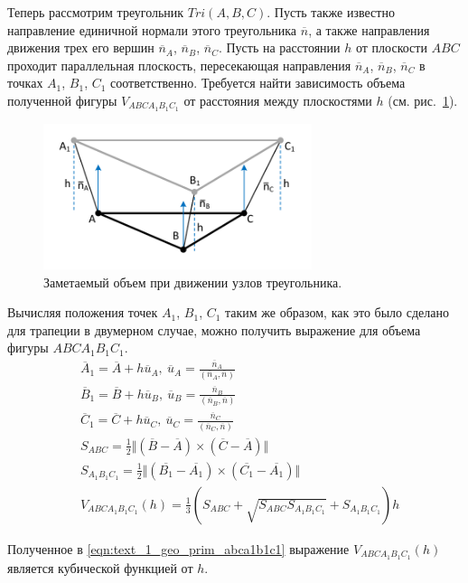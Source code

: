 Теперь рассмотрим треугольник $Tri(A, B, C)$.
Пусть также известно направление единичной нормали этого треугольника $\overline{n}$, а также направления движения трех его вершин $\overline{n}_A$, $\overline{n}_B$, $\overline{n}_C$.
Пусть на расстоянии $h$ от плоскости $ABC$ проходит параллельная плоскость, пересекающая направления $\overline{n}_A$, $\overline{n}_B$, $\overline{n}_C$ в точках $A_1$, $B_1$, $C_1$ соответственно.
Требуется найти зависимость объема полученной фигуры $V_{ABCA_1B_1C_1}$ от расстояния между плоскостями $h$ (см. рис.~\ref{fig:text_1_geo_prim_pyramid_partial}).

\begin{figure}[ht]
\centering
\includegraphics[width=0.7\textwidth]{./pics/text_1_geo_prim/pyramid_partial.pdf}
\caption{Заметаемый объем при движении узлов треугольника.}
\label{fig:text_1_geo_prim_pyramid_partial}
\end{figure}

Вычисляя положения точек $A_1$, $B_1$, $C_1$ таким же образом, как это было сделано для трапеции в двумерном случае, можно получить выражение для объема фигуры $ABCA_1B_1C_1$.
\begin{equation}\label{eqn:text_1_geo_prim_abca1b1c1}
	\begin{aligned}
		& \overline{A}_1 = \overline{A} + h \overline{u}_A, \ \overline{u}_A = \frac{\overline{n}_A}{(\overline{n}_A, \overline{n})} \\
		& \overline{B}_1 = \overline{B} + h \overline{u}_B, \ \overline{u}_B = \frac{\overline{n}_B}{(\overline{n}_B, \overline{n})} \\
		& \overline{C}_1 = \overline{C} + h \overline{u}_C, \ \overline{u}_C = \frac{\overline{n}_C}{(\overline{n}_C, \overline{n})} \\
		& S_{ABC} = \frac{1}{2} \Vert (\overline{B} - \overline{A}) \times (\overline{C} - \overline{A}) \Vert \\
		& S_{A_1B_1C_1} = \frac{1}{2} \Vert (\overline{B_1} - \overline{A_1}) \times (\overline{C_1} - \overline{A_1}) \Vert \\
		& V_{ABCA_1B_1C_1}(h) = \frac{1}{3} \left( S_{ABC} + \sqrt{S_{ABC} S_{A_1B_1C_1}} + S_{A_1B_1C_1} \right) h
	\end{aligned}
\end{equation}

Полученное в \eqref{eqn:text_1_geo_prim_abca1b1c1} выражение $V_{ABCA_1B_1C_1}(h)$ является кубической функцией от $h$.
